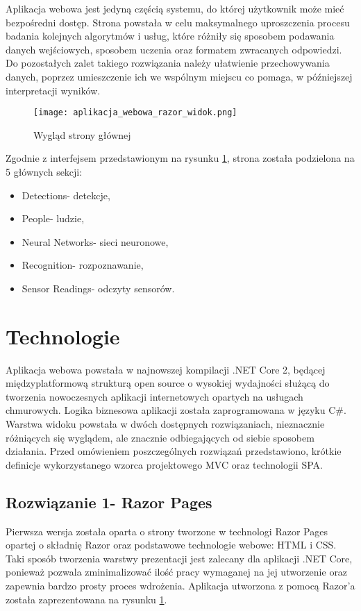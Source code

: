 Aplikacja webowa jest jedyną częścią systemu, do której użytkownik może mieć bezpośredni dostęp. Strona powstała w celu maksymalnego uproszczenia procesu badania kolejnych algorytmów i usług, które różniły się sposobem podawania danych wejściowych, sposobem uczenia oraz formatem zwracanych odpowiedzi. Do pozostałych zalet takiego rozwiązania należy ułatwienie przechowywania danych, poprzez umieszczenie ich we wspólnym miejscu co pomaga, w późniejszej interpretacji wyników.
\begin{figure}[H]
	\centering
	\texttt{[image: aplikacja\_webowa\_razor\_widok.png]}
	\caption{Wygląd strony głównej}
	\label{fig:strona_glowna_razor}
\end{figure}
Zgodnie z interfejsem przedstawionym na rysunku \ref{fig:strona_glowna_razor}, strona została podzielona na 5 głównych sekcji:
\begin{itemize}
\item Detections- detekcje,
\item People- ludzie,
\item Neural Networks- sieci neuronowe,
\item Recognition- rozpoznawanie,
\item Sensor Readings- odczyty sensorów.
\end{itemize}

\section{Technologie}
Aplikacja webowa powstała w najnowszej kompilacji .NET Core 2, będącej międzyplatformową strukturą open source o wysokiej wydajności służącą do tworzenia nowoczesnych aplikacji internetowych opartych na usługach chmurowych. Logika biznesowa aplikacji została zaprogramowana w języku C\#. Warstwa widoku powstała w dwóch dostępnych rozwiązaniach, nieznacznie różniących się wyglądem, ale znacznie odbiegających od siebie sposobem działania. Przed omówieniem poszczególnych rozwiązań przedstawiono, krótkie definicje wykorzystanego wzorca projektowego MVC oraz technologii SPA. 

\subsection{Rozwiązanie 1- Razor Pages}
Pierwsza wersja została oparta o strony tworzone w technologi Razor Pages opartej o składnię Razor oraz podstawowe technologie webowe: HTML i CSS. Taki sposób tworzenia warstwy prezentacji jest zalecany dla aplikacji .NET Core, ponieważ pozwala zminimalizować ilość pracy wymaganej na jej utworzenie oraz zapewnia bardzo prosty proces wdrożenia. Aplikacja utworzona z pomocą Razor'a została zaprezentowana na rysunku \ref{fig:strona_glowna_razor}.

